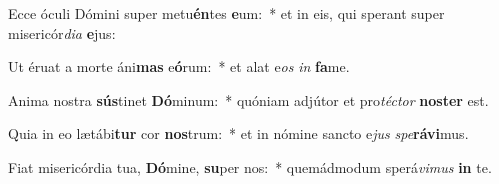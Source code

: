\item Ecce óculi Dómini super metu\textbf{én}tes \textbf{e}um:~* et in eis, qui sperant super misericór\textit{di}\textit{a} \textbf{e}jus:
\item Ut éruat a morte áni\textbf{mas} e\textbf{ó}rum:~* et alat e\textit{os} \textit{in} \textbf{fa}me.
\item Anima nostra \textbf{sús}tinet \textbf{Dó}minum:~* quóniam adjútor et pro\textit{téc}\textit{tor} \textbf{nos}\textbf{ter} est.
\item Quia in eo lætábi\textbf{tur} cor \textbf{nos}trum:~* et in nómine sancto e\textit{jus} \textit{spe}\textbf{rá}\textbf{vi}mus.
\item Fiat misericórdia tua, \textbf{Dó}mine, \textbf{su}per nos:~* quemádmodum sperá\textit{vi}\textit{mus} \textbf{in} te.

